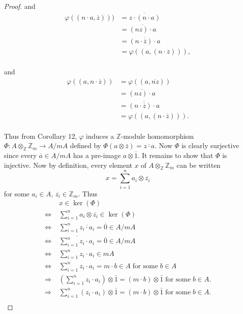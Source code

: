 \documentclass{article}
\begin{document}
\begin{enumerate}[label={(\alph*)}]
\begin{proof}
        and
        \begin{align*}
          \varphi((n\cdot a,\overline{z})))
          &=\overline{z\cdot (n\cdot a)}\\
          &=\overline{(nz)\cdot a}\\
          &=\overline{(n\cdot\overline{z})\cdot a}\\
          &=\varphi((a, (n\cdot \overline{z}))),\\
        \end{align*}

        and
        \begin{align*}
          \varphi((a,n\cdot\overline{z}))
          &=\varphi((a,\overline{nz}))\\
          &=\overline{(nz)\cdot a}\\
          &=\overline{(n\cdot\overline{z})\cdot a}\\
          &=\varphi((a, (n\cdot \overline{z}))).\\
        \end{align*}

        Thus from Corollary 12, $\varphi$ induces a $\mathbb{Z}$-module
        homomorphism $\Phi:A\otimes_\mathbb{Z}\mathbb{Z}_m \rightarrow
        A/mA$ defined by $\Phi(a\otimes\bar{z})=\overline{z\cdot a}$. Now
        $\Phi$ is clearly surjective since every $\overline{a}\in
        A/mA$ has a pre-image $a\otimes\bar{1}$. It remains to show that
        $\Phi$ is injective. Now by definition, every element $x$ of
        $A\otimes_\mathbb{Z}\mathbb{Z}_m$ can be written
        \[x=\sum_{i=1}^n a_i\otimes\overline{z_i}\]
        for some $a_i\in A$, $\overline{z_i}\in\mathbb{Z}_m$. Thus
        \begin{align*}
          \;&x\in\ker(\Phi)\\
          \Leftrightarrow\;&\sum_{i=1}^n a_i\otimes\overline{z_i}
            \in\ker(\Phi)\\
          \Leftrightarrow\;&\sum_{i=1}^n \overline{z_i\cdot
            a_i}=\overline{0}\in A/mA\\
          \Leftrightarrow\;&\overline{\sum_{i=1}^n z_i\cdot
            a_i}=\overline{0}\in A/mA\\
          \Leftrightarrow\;&\sum_{i=1}^n z_i\cdot a_i\in mA\\
          \Leftrightarrow\;&\sum_{i=1}^n z_i\cdot a_i =m\cdot b\in A\;
            \text{for some}\; b\in A\\
          \Rightarrow\;&\left(\sum_{i=1}^n z_i\cdot a_i\right)
            \otimes\bar{1}=(m\cdot b)\otimes\bar{1}\; \text{for some}\;
            b\in A.\\
          \Rightarrow\;&\sum_{i=1}^n (z_i\cdot a_i)\otimes\bar{1} =(m\cdot
            b)\otimes\bar{1}\; \text{for some}\; b\in A.\\
        \end{align*}


\end{proof}
\end{enumerate}
\end{document}
